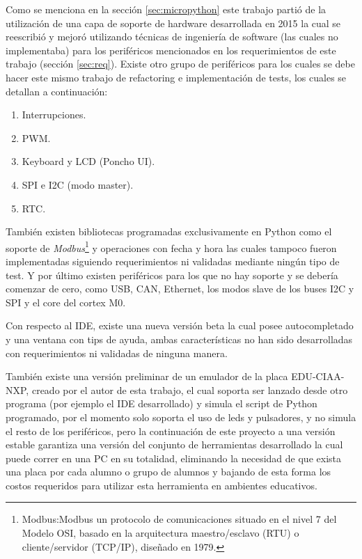 Como se menciona en la sección \ref{sec:micropython} este trabajo partió de la utilización de una capa de soporte de hardware desarrollada en 2015 la cual se reescribió y mejoró utilizando técnicas de ingeniería de software (las cuales no implementaba) para los periféricos mencionados en los requerimientos de este trabajo (sección \ref{sec:req}). Existe otro grupo de periféricos para los cuales se debe hacer este mismo trabajo de refactoring e implementación de tests, los cuales se detallan a continuación:

\begin{enumerate}
	\item  Interrupciones.
	\item  PWM.
	\item  Keyboard y LCD (Poncho UI). 
	\item  SPI e I2C (modo master).
	\item  RTC.
\end{enumerate}

También existen bibliotecas programadas exclusivamente en Python como el soporte de \textit{Modbus}\footnote{Modbus:Modbus un protocolo de comunicaciones situado en el nivel 7 del Modelo OSI, basado en la arquitectura maestro/esclavo (RTU) o cliente/servidor (TCP/IP), diseñado en 1979.} y operaciones con fecha y hora las cuales tampoco fueron implementadas siguiendo requerimientos ni validadas mediante ningún tipo de test. Y por último existen periféricos para los que no hay soporte y se debería comenzar de cero, como USB, CAN, Ethernet, los modos slave de los buses I2C y SPI y el core del cortex M0.

Con respecto al IDE, existe una nueva versión beta la cual posee autocompletado y una ventana con tips de ayuda, ambas características no han sido desarrolladas con requerimientos ni validadas de ninguna manera.

También existe una versión preliminar de un emulador de la placa EDU-CIAA-NXP, creado por el autor de esta trabajo, el cual soporta ser lanzado desde otro programa (por ejemplo el IDE desarrollado) y simula el script de Python programado, por el momento solo soporta el uso de leds y pulsadores, y no simula el resto de los periféricos, pero la continuación de este proyecto a una versión estable garantiza una versión del conjunto de herramientas desarrollado la cual puede correr en una PC en su totalidad, eliminando la necesidad de que exista una placa por cada alumno o grupo de alumnos y bajando de esta forma los costos requeridos para utilizar esta herramienta en ambientes educativos.

